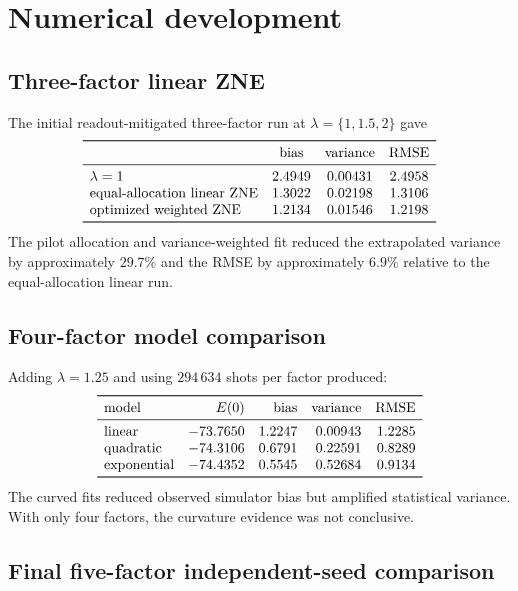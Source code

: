 \documentclass[11pt]{article}
\begin{document}
\section{Numerical development}

\subsection{Three-factor linear ZNE}

The initial readout-mitigated three-factor run at
$\lambda=\{1,1.5,2\}$ gave
\[
\begin{array}{lccc}
\toprule
 & \text{bias} & \text{variance} & \text{RMSE}\\
\midrule
\lambda=1                         & 2.4949 & 0.00431 & 2.4958\\
\text{equal-allocation linear ZNE}& 1.3022 & 0.02198 & 1.3106\\
\text{optimized weighted ZNE}     & 1.2134 & 0.01546 & 1.2198\\
\bottomrule
\end{array}
\]
The pilot allocation and variance-weighted fit reduced the extrapolated
variance by approximately $29.7\%$ and the RMSE by approximately $6.9\%$
relative to the equal-allocation linear run.

\subsection{Four-factor model comparison}

Adding $\lambda=1.25$ and using $294\,634$ shots per factor produced:
\[
\begin{array}{lrrrr}
\toprule
\text{model} & E(0) & \text{bias} & \text{variance} & \text{RMSE}\\
\midrule
\text{linear}      & -73.7650 & 1.2247 & 0.00943 & 1.2285\\
\text{quadratic}   & -74.3106 & 0.6791 & 0.22591 & 0.8289\\
\text{exponential} & -74.4352 & 0.5545 & 0.52684 & 0.9134\\
\bottomrule
\end{array}
\]
The curved fits reduced observed simulator bias but amplified statistical
variance.  With only four factors, the curvature evidence was not conclusive.

\subsection{Final five-factor independent-seed comparison}
\end{document}
